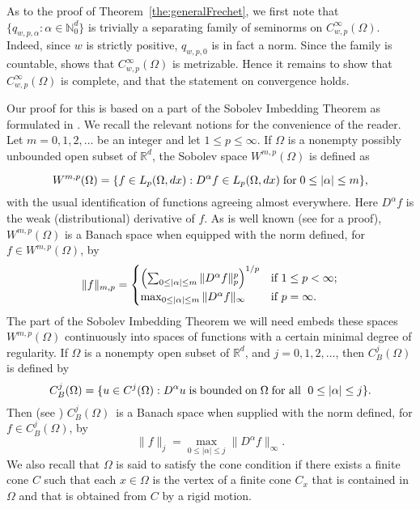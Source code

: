 \documentclass[12pt, reqno]{amsart}
\numberwithin{equation}{section}
\theoremstyle{plain}
\theoremstyle{definition}
\begin{document}
As to the proof of Theorem~\ref{the:generalFrechet}, we first note that $\{{{q_{w,p,\alpha}}} :\alpha\in{{\mathbb N}}_0^d\}$ is trivially a separating family of seminorms on ${{C_{w,p}^\infty(\Omega)}}$. Indeed, since $w$ is strictly positive, $q_{w,p,0}$ is in fact a norm. Since the family is countable, \cite[Chapter~IV~Proposition~2.1]{Conway} shows that ${{C_{w,p}^\infty(\Omega)}}$ is metrizable. Hence it remains to show that ${{C_{w,p}^\infty(\Omega)}}$ is complete, and that the statement on convergence holds.

Our proof for this is based on a part of the Sobolev Imbedding Theorem as formulated in \cite{Adams}. We recall the relevant notions for the convenience of the reader. Let $m=0,1,2,\ldots$ be an integer and let $1\leq p\leq\infty$. If $\Omega$ is a nonempty possibly unbounded open subset of ${{\mathbb R}}^d$, the Sobolev space $W^{m,p}(\Omega)$ is defined as

\begin{equation*}
W^{m,p}(\Omega) = \{f\in L_{p}(\Omega, dx):D^{\alpha}f\in L_{p}(\Omega, dx)\;\textup{for}\;0\leq|\alpha|\leq m\},
\end{equation*}
with the usual identification of functions agreeing almost everywhere. Here $D^\alpha f$ is the weak (distributional) derivative of $f$. As is well known (see \cite[3.3]{Adams} for a proof), $W^{m,p}(\Omega)$ is a Banach space when equipped with the norm defined, for $f\in W^{m,p}(\Omega)$, by
\begin{equation*}
\|f\|_{m,p}=
\begin{cases}
\left(\sum_{0\leq|\alpha|\leq m}\|D^\alpha f\Vert_p^p\right)^{1/p} &\textup{if }1\leq p<\infty;\\
\max_{0\leq|\alpha|\leq m} \Vert D^\alpha f\Vert_\infty&\textup{if }p=\infty.
\end{cases}
\end{equation*}
The part of the Sobolev Imbedding Theorem we will need embeds these spaces $W^{m,p}(\Omega)$ continuously into spaces of functions with a certain minimal degree of regularity. If $\Omega$ is a nonempty open subset of ${{\mathbb R}}^d$, and $j=0,1,2,\ldots$, then $C_B^j(\Omega)$ is defined by
\begin{equation*}
C_{B}^{j}(\Omega)=\{u\in C^{j}(\Omega):D^{\alpha}u\;\textup{is\;bounded\;on}\;\Omega\;\textup{for all }\;0\leq|\alpha|\leq j\}.
\end{equation*}
Then (see \cite[1.27]{Adams}) $C_B^j(\Omega)$\ is a Banach space when supplied with the norm defined, for $f\in C_B^j(\Omega)$, by
\begin{equation*}
\| f\|_j=\max_{0\leq |\alpha|\leq j}\| D^\alpha f\|_\infty.
\end{equation*}
We also recall that $\Omega$ is said to satisfy the cone condition if there exists a finite cone $C$ such that each $x\in\Omega$ is the vertex of a finite cone $C_x$ that is contained in $\Omega$ and that is obtained from $C$ by a rigid motion.
\end{document}
